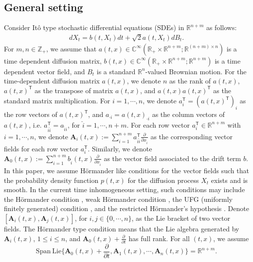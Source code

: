 \documentclass[11pt,reqno]{amsart}
\newcommand{\ts}{\mathsf{T}}
\newcommand{\bea}{\begin{eqnarray}}
\newcommand{\eea}{\end{eqnarray}}
\def\hR{\mathbb{R}}
\begin{document}
\subsection{General setting}
Consider It\^o type stochastic differential equations (SDEs) in $\mathbb R^{n+m}$ as follows:
\bea \label{SDE setting}
dX_t = b(t,X_t)dt+\sqrt{2}a(t,X_t)dB_t.
\eea 
For $m,n\in\mathbb Z_+$, we assume that $a(t,x)\in \mathbb C^{\infty}(\hR_+\times\mathbb{R}^{n+m}; \mathbb{R}^{(n+m)\times n})$ is a time dependent diffusion matrix, $b(t,x)\in \mathbb C^{\infty}(\hR_+\times\hR^{n+m}; \hR^{n+m})$ is a time dependent vector field, and $B_t$ is a standard $\mathbb R^n$-valued Brownian motion. For the time-dependent diffusion matrix $a(t,x)$, we denote $n$ as the rank of $a(t,x)$, $a(t,x)^{\ts}$ as the transpose of matrix $a(t,x)$, and $a(t,x)a(t,x)^{\ts}$ as the standard matrix multiplication. For $i=1,\cdots, n$,  we denote $a^{\ts}_i=(a(t,x)^{\ts})_i$ as the row vectors of $a(t,x)^{\ts}$, and $a_{\cdot i}=a(t,x)_{\cdot i}$ as the column vectors of $a(t,x)$, i.e. $a^{\ts}_{i\hat i}=a_{\hat ii}$, for $\hat i=1,\cdots, n+m$. 
For each row vector  $a^{\ts}_i\in \mathbb R^{n+m}$ with $i=1,\cdots,n$, we denote $\mathbf A_i(t,x):=\sum_{\hat i=1}^{n+m}a^{\ts}_{i\hat i}\frac{\partial}{\partial x_{\hat i}}$ as the corresponding vector fields for each row vector $a^{\ts}_i$. Similarly, we denote $\mathbf A_0(t, x):=\sum_{\hat i=1}^{n+m}b_{\hat i}(t,x)\frac{\partial}{\partial x_{\hat i}}$ as the vector field associated to the drift term $b$. In this paper, we assume H\"ormander like conditions \cite{hormander} for the vector fields such that the probability density function $p(t,x)$ for the diffusion process $X_t$ exists and is smooth. In the current time inhomogeneous setting, such conditions may include the H\"ormander condition \cite{Cattiaux}, weak H\"ormander condition \cite{hopfner2017}, the UFG (uniformly finitely generated) condition \cite{Cass2021}, and the restricted H\"ormander’s hypothesis \cite{Chaleyat-Maurel}.
Denote $[\mathbf A_i(t,x),\mathbf A_j(t,x)]$, for $i,j\in\{ 0,\cdots,n\}$, as the Lie bracket of two vector fields. The H\"ormander type condition means that the Lie algebra generated by $\mathbf A_i(t,x)$, $1\le i\le n$, and $\mathbf A_0(t,x)+\frac{\partial}{\partial t}$ has full rank. For all $(t,x)$, we assume
\begin{equation*}
    \mathrm{Span}~ \mathrm{Lie}\Big\{\mathbf A_0(t,x)+\frac{\partial}{\partial t}, \mathbf A_1(t, x),\cdots, \mathbf A_n(t,x) \Big\}=\hR^{n+m}.
\end{equation*}
\end{document}
